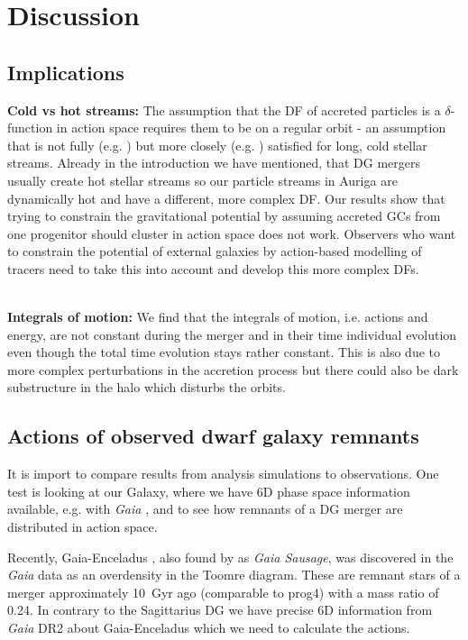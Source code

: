 \section{Discussion} \label{sec:Discussion}
\subsection{Implications}
\textbf{Cold vs hot streams:}
The assumption that the \ac{DF} of accreted particles is a $\delta$-function in action space requires them to be on a regular orbit - an assumption that is not fully (e.g. \citealp{Erkal...Pal5pert...2017}) but more closely (e.g. \citealp{Price-Whelan...chaos...2016}) satisfied for long, cold stellar streams. Already in the introduction we have mentioned, that \ac{DG} mergers usually create hot stellar streams so our particle streams in Auriga are dynamically hot and have a different, more complex \ac{DF}. Our results show that trying to constrain the gravitational potential by assuming accreted \acp{GC} from one progenitor should cluster in action space does not work. Observers who want to constrain the potential of external galaxies by action-based modelling of tracers need to take this into account and develop this more complex \acp{DF}.

\\\textbf{Integrals of motion:} We find that the integrals of motion, i.e. actions and energy, are not constant during the merger and in their time individual evolution even though the total time evolution stays rather constant. This is also due to more complex perturbations in the accretion process but there could also be dark substructure in the halo which disturbs the orbits.


\subsection{Actions of observed dwarf galaxy remnants}
It is import to compare results from analysis simulations to observations. One test is looking at our Galaxy, where we have 6D phase space information available, e.g. with \textit{Gaia} \citep{Gaia...mission...2016, GaiaDR2...overview...2018}, and to see how remnants of a \ac{DG} merger are distributed in action space.

Recently, Gaia-Enceladus \citep{Enceladus....Helmi...2018}, also found by \citet{Belokurov....Sausage...2018, Myeong...SausageGCs...2018} as \textit{Gaia Sausage}, was discovered in the \textit{Gaia} data as an overdensity in the Toomre diagram. These are remnant stars of a merger approximately \SI{10}{Gyr} ago (comparable to prog4) with a mass ratio of 0.24. In contrary to the Sagittarius \ac{DG} we have precise 6D information from \textit{Gaia} DR2 about Gaia-Enceladus which we need to calculate the actions. 

